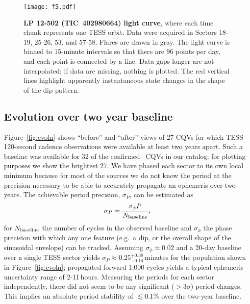 \documentclass[11pt,twocolumn,tighten]{aastex63}
\begin{document}
\begin{figure*}[!tp]
	\begin{center}
		\centering
		\texttt{[image: f5.pdf]}
		\vspace{-0.3cm}
		\caption{
      {\bf LP 12-502 (TIC~402980664) light curve}, where each time
      chunk represents one TESS orbit.  Data were acquired in Sectors
      18-19, 25-26, 53, and 57-58.  Flares are drawn in gray.  The
      light curve is binned to 15-minute intervals so that there are
      96 points per day, and each point is connected by a line.  Data
      gaps longer are not interpolated; if data are missing, nothing
      is plotted.  The red vertical lines highlight apparently
      instantaneous state changes in the shape of the dip pattern.  
		}
		\label{fig:lplc}
	\end{center}
\end{figure*}


\subsection{Evolution over two year baseline}

Figure~\ref{fig:evoln} shows ``before'' and ``after'' views of 27 CQVs
for which TESS 120-second cadence observations were available at least
two years apart.  Such a baseline was available for 32 of the
confirmed \ngoods\ CQVs in our catalog; for plotting purposes we show
the brightest 27.  We have phased each sector to its own local minimum
because for most of the sources we do not know the period at the
precision necessary to be able to accurately propagate an ephemeris
over two years.  The achievable period precision, $\sigma_P$, can be
estimated as
\begin{equation}
  \sigma_{P} = \frac { \sigma_{\phi} P } { N_{\rm baseline} },
  \label{eq:periodprecision}
\end{equation}
for $N_{\rm baseline}$ the number of cycles in the observed baseline
and $\sigma_{\phi}$ the phase precision with which any one feature
(e.g.~a dip, or the overall shape of the sinusoidal envelope) can be
tracked.  Assuming $\sigma_\phi$$\approx$$0.02$ and a 20-day baseline
over a single TESS sector yields
$\sigma_{P}$$\approx$$0.25^{+0.38}_{-0.14}$\,minutes for the
population shown in Figure~\ref{fig:evoln}; propagated forward 1{,}000
cycles yields a typical ephemeris uncertainty range of 2-11\,hours.
Measuring the periods for each sector independently, there did not
seem to be any significant ($>$3$\sigma$) period changes.  This
implies an absolute period stability of $\lesssim$0.1\% over the
two-year baseline.
\end{document}
